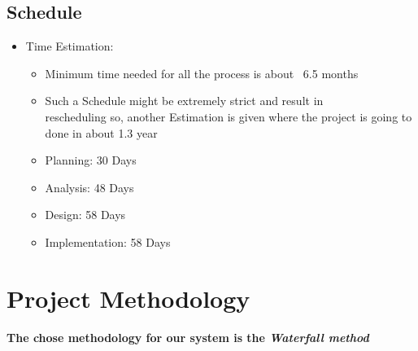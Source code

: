 \documentclass[12pt]{article}
\begin{document}
\subsection{Schedule}
\begin{itemize}
    \item Time Estimation:
          \begin{itemize}
              \item Minimum time needed for all the process is about~ 6.5 months
              \item Such a Schedule might be extremely strict and result in \\ rescheduling so, another Estimation is given where the project is going to done in about 1.3 year
              \item Planning: 30 Days
              \item Analysis: 48 Days
              \item Design: 58 Days
              \item Implementation: 58 Days
          \end{itemize}
\end{itemize}
\section{Project Methodology}
\textbf{The chose methodology for our system is the \textit{Waterfall method}}
\end{document}
